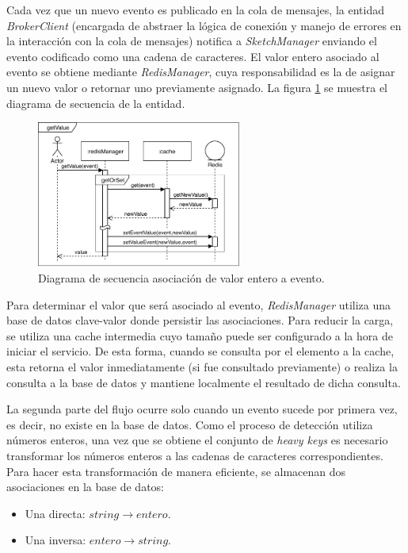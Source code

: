 \documentclass[a4paper,10pt, oneside]{article}
\begin{document}
Cada vez que un nuevo evento es publicado en la cola de mensajes, la entidad \textit{BrokerClient} (encargada de abstraer la lógica de conexión y manejo de errores en la interacción con la cola de mensajes) notifica a \textit{SketchManager} enviando el evento codificado como una cadena de caracteres. El valor entero asociado al evento se obtiene mediante \textit{RedisManager}, cuya responsabilidad es la de asignar un nuevo valor o retornar uno previamente asignado. La figura \ref{diag:redis_manager} se muestra el diagrama de secuencia de la entidad.

\begin{figure}[hb]
	\centering
	\includegraphics[width=0.6\textwidth]{./graph/SecDiag-redisManagerGetValue.pdf}
	\caption{Diagrama de secuencia asociación de valor entero a evento.}
	\label{diag:redis_manager}
\end{figure}

Para determinar el valor que será asociado al evento, \textit{RedisManager} utiliza una base de datos clave-valor donde persistir las asociaciones. Para reducir la carga, se utiliza una cache intermedia cuyo tamaño puede ser configurado a la hora de iniciar el servicio. De esta forma, cuando se consulta por el elemento a la cache, esta retorna el valor inmediatamente (si fue consultado previamente) o realiza la consulta a la base de datos y mantiene localmente el resultado de dicha consulta. 

La segunda parte del flujo ocurre solo cuando un evento sucede por primera vez, es decir, no existe en la base de datos. Como el proceso de detección utiliza números enteros, una vez que se obtiene el conjunto de \textit{heavy keys} es necesario transformar los números enteros a las cadenas de caracteres correspondientes. Para hacer esta transformación de manera eficiente, se almacenan dos asociaciones en la base de datos:
\begin{itemize}
	\item Una directa: $string \rightarrow entero$.
	\item Una inversa: $entero \rightarrow string$.
\end{itemize}
\end{document}
